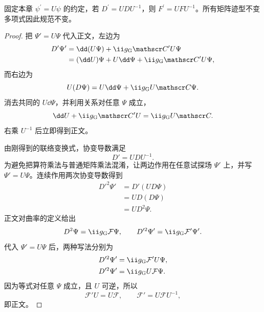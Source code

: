 \begin{proposition}[曲率的规范协变性]
固定本章 $\psi^\prime=U\psi$ 的约定，若 $D^\prime=UDU^{-1}$，则 $F^\prime=UFU^{-1}$。所有矩阵迹型不变多项式因此规范不变。
\end{proposition}
\begin{proof}
把 $\Psi'=U\Psi$ 代入正文，左边为
\begin{align*}
 D'\Psi'
 &=\dd(U\Psi)+\ii g_{\rm G}\mathscr C'U\Psi\\
 &=(\dd U)\Psi+U\dd\Psi+\ii g_{\rm G}\mathscr C'U\Psi,
\end{align*}
而右边为
\begin{equation*}
 U(D\Psi)=U\dd\Psi+\ii g_{\rm G}U\mathscr C\Psi.
\end{equation*}
消去共同的 $U\dd\Psi$，并利用关系对任意 $\Psi$ 成立，
\begin{equation*}
 \dd U+\ii g_{\rm G}\mathscr C'U=\ii g_{\rm G}U\mathscr C.
\end{equation*}
右乘 $U^{-1}$ 后立即得到正文。

由刚得到的联络变换式，协变导数满足
\[
D'=UDU^{-1}.
\]
为避免把算符乘法与普通矩阵乘法混淆，让两边作用在任意试探场 $\Psi'$ 上，并写 $\Psi'=U\Psi$。连续作用两次协变导数得到
\begin{align*}
D'^2\Psi'
&=D'\!\left(U D\Psi\right)\\
&=U D(D\Psi)\\
&=U D^2\Psi.
\end{align*}
正文对曲率的定义给出
\[
D^2\Psi=\ii g_{\rm G}\mathcal F\Psi,
\qquad
D'^2\Psi'=\ii g_{\rm G}\mathcal F'\Psi'.
\]
代入 $\Psi'=U\Psi$ 后，两种写法分别为
\begin{align*}
D'^2\Psi'
&=\ii g_{\rm G}\mathcal F' U\Psi,\\
D'^2\Psi'
&=\ii g_{\rm G}U\mathcal F\Psi.
\end{align*}
因为等式对任意 $\Psi$ 成立，且 $U$ 可逆，所以
\[
\mathcal F'U=U\mathcal F,
\qquad
\mathcal F'=U\mathcal F U^{-1},
\]
即正文。
\end{proof}

